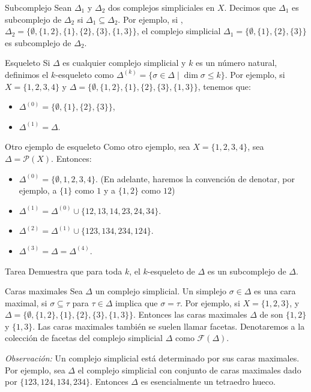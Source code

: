 \documentclass[spanish, presentation]{beamer}
\begin{document}
\begin{frame}[label={sec:org71b5183}]{Subcomplejo}
Sean \(\Delta_{1}\) y \(\Delta_{2}\) dos complejos simpliciales en \(X\). Decimos que \(\Delta_{1}\) es \alert{subcomplejo}
 de \(\Delta_{2}\) si \(\Delta_{1}\subseteq \Delta_{2}\). Por ejemplo, si , \(\Delta_{2}=\{\emptyset,\{1,2\},\{1\},\{2\},\{3\},\{1,3\}\}\), el complejo simplicial \(\Delta_{1}=\{\emptyset,\{1\},\{2\},\{3\}\}\) es subcomplejo de \(\Delta_{2}\).
\end{frame}

\begin{frame}[label={sec:orga5a9f84}]{Esqueleto}
Si \(\Delta\) es cualquier complejo simplicial y \(k\) es un número natural, definimos el \alert{\(k\)-esqueleto}
 como \(\Delta^{(k)}=\{\sigma\in\Delta\mid \dim\sigma\leq k\}\). Por ejemplo, si \(X=\{1,2,3,4\}\) y  \(\Delta=\{\emptyset,\{1,2\},\{1\},\{2\},\{3\},\{1,3\}\}\), tenemos que:
\begin{itemize}
\item \(\Delta^{(0)}=\{\emptyset,\{1\},\{2\},\{3\}\}\),
\item \(\Delta^{(1)}=\Delta\).
\end{itemize}
\end{frame}

\begin{frame}[label={sec:orgb7b1b2a}]{Otro ejemplo de esqueleto}
Como otro ejemplo, sea \(X=\{1,2,3,4\}\), sea \(\Delta=\mathcal{P}(X)\). Entonces:
\begin{itemize}
\item \(\Delta^{(0)}=\{\emptyset, 1,2,3,4\}\). (En adelante, haremos la convención de denotar, por ejemplo, a \(\{1\}\) como \(1\) y a \(\{1,2\}\) como \(12\))
\item \(\Delta^{(1)}=\Delta^{(0)}\cup\{12,13,14,23,24,34\}\).
\item \(\Delta^{(2)}=\Delta^{(1)}\cup\{123,134,234,124\}\).
\item \(\Delta^{(3)}=\Delta=\Delta^{(4)}\).
\end{itemize}

\alert{Tarea}   Demuestra que para toda \(k\), el \(k\)-esqueleto de \(\Delta\) es un subcomplejo de \(\Delta\).
\end{frame}

\begin{frame}[label={sec:orgf52c318}]{Caras maximales}
Sea \(\Delta\) un complejo simplicial. Un simplejo \(\sigma\in \Delta\) es una \alert{cara maximal}, si \(\sigma\subseteq\tau\) para \(\tau\in\Delta\) implica que \(\sigma=\tau\).
Por ejemplo, si \(X=\{1,2,3\}\), y \(\Delta=\{\emptyset,\{1,2\},\{1\},\{2\},\{3\},\{1,3\}\}\). Entonces las caras maximales \(\Delta\) de son \(\{1,2\}\) y \(\{1,3\}\). Las caras maximales también se suelen llamar \alert{facetas}. Denotaremos a la colección de facetas del complejo simplicial \(\Delta\) como \(\mathcal{F}(\Delta)\).

\emph{Observación:}
Un complejo simplicial está determinado por sus caras maximales. Por ejemplo, sea \(\Delta\) el complejo simplicial con conjunto de caras maximales dado por \(\{123,124,134,234\}\). Entonces \(\Delta\) es esencialmente un tetraedro hueco.
\end{frame}
\end{document}
